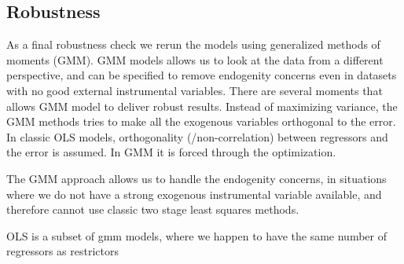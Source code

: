 \begin{table}[]
\centering
\captionsetup{justification=centering}

\caption{Count of companies with significant Granger causality between information demand variables and news count.}
\label{tab:gr_caus_weekly}
\end{table}

\subsection{Robustness}
As a final robustness check we rerun the models using generalized methods of moments (GMM). GMM models allows us to look at the data from a different perspective, and can be specified to remove endogenity concerns even in datasets with no good external instrumental variables. There are several moments that allows GMM model to deliver robust results. Instead of maximizing variance, the GMM methods tries to make all the exogenous variables orthogonal to the error. In classic OLS models, orthogonality (/non-correlation) between regressors and the error is assumed. In GMM it is forced through the optimization.

The GMM approach allows us to handle the endogenity concerns, in situations where we do not have a strong exogenous instrumental variable available, and therefore cannot use classic two stage least squares methods. 

OLS is a subset of gmm models, where we happen to have the same number of regressors as restrictors 